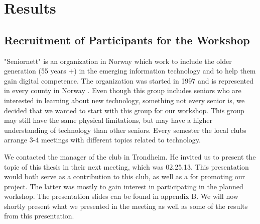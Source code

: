 \chapter{Results}
\section{Recruitment of Participants for the Workshop}
"Seniornett" is an organization in Norway which work to include the older generation (55 years +) in the emerging information technology and to help them gain digital competence. The organization was started in 1997 and is represented in every county in Norway \cite{seniornett}. Even though this group includes seniors who are interested in learning about new technology, something not every senior is, we decided that we wanted to start with this group for our workshop. This group may still have the same physical limitations, but may have a higher understanding of technology than other seniors. Every semester the local clubs arrange 3-4 meetings with different topics related to technology.

We contacted the manager of the club in Trondheim. He invited us to present the topic of this thesis in their next meeting, which was 02.25.13. This presentation would both serve as a contribution to this club, as well as a for promoting our project. The latter was mostly to gain interest in participating in the planned workshop. The presentation slides can be found in appendix B. We will now shortly present what we presented in the meeting as well as some of the results from this presentation. 

